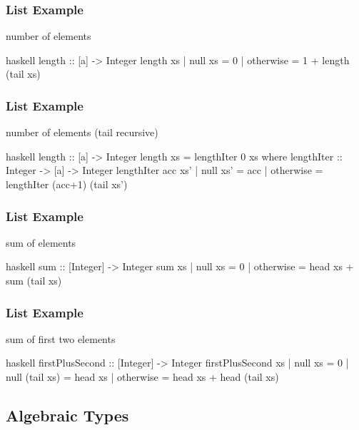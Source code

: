 \documentclass[dvipsnames]{beamer}
\theoremstyle{plain}
\begin{document}
\begin{frame}[fragile]
  \frametitle{List Example}

  \begin{exampleblock}{number of elements}
    \begin{pygments}{haskell}
length :: [a] -> Integer
length xs
  | null xs   = 0
  | otherwise = 1 + length (tail xs)
    \end{pygments}
  \end{exampleblock}
\end{frame}

\begin{frame}[fragile]
  \frametitle{List Example}

  \begin{exampleblock}{number of elements (tail recursive)}
    \begin{pygments}{haskell}
length :: [a] -> Integer
length xs = lengthIter 0 xs
  where
    lengthIter :: Integer -> [a] -> Integer
    lengthIter acc xs'
      | null xs'  = acc
      | otherwise = lengthIter (acc+1) (tail xs')
    \end{pygments}
  \end{exampleblock}
\end{frame}

\begin{frame}[fragile]
  \frametitle{List Example}

  \begin{exampleblock}{sum of elements}
    \begin{pygments}{haskell}
sum :: [Integer] -> Integer
sum xs
  | null xs   = 0
  | otherwise = head xs + sum (tail xs)
    \end{pygments}
  \end{exampleblock}
\end{frame}

\begin{frame}[fragile]
  \frametitle{List Example}

  \begin{exampleblock}{sum of first two elements}
    \begin{pygments}{haskell}
firstPlusSecond :: [Integer] -> Integer
firstPlusSecond xs
  | null xs        = 0
  | null (tail xs) = head xs
  | otherwise      = head xs + head (tail xs)
    \end{pygments}
  \end{exampleblock}
\end{frame}

\subsection{Algebraic Types}
\end{document}

